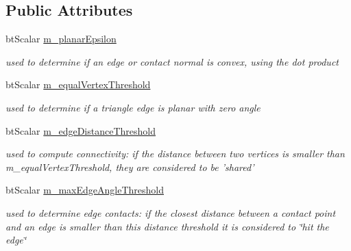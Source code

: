 \subsection*{Public Attributes}
\begin{CompactItemize}
\item 
\hypertarget{structbt_triangle_info_map_7516c96369cd0eef22286b7e5ad537e8}{
btScalar \hyperlink{structbt_triangle_info_map_7516c96369cd0eef22286b7e5ad537e8}{m\_\-planarEpsilon}}
\label{structbt_triangle_info_map_7516c96369cd0eef22286b7e5ad537e8}

\begin{CompactList}\small\item\em used to determine if an edge or contact normal is convex, using the dot product \item\end{CompactList}\item 
\hypertarget{structbt_triangle_info_map_a980d33e5be082442a128f0ba2efb064}{
btScalar \hyperlink{structbt_triangle_info_map_a980d33e5be082442a128f0ba2efb064}{m\_\-equalVertexThreshold}}
\label{structbt_triangle_info_map_a980d33e5be082442a128f0ba2efb064}

\begin{CompactList}\small\item\em used to determine if a triangle edge is planar with zero angle \item\end{CompactList}\item 
\hypertarget{structbt_triangle_info_map_521c0769aefc5c02b8394f924127dfc5}{
btScalar \hyperlink{structbt_triangle_info_map_521c0769aefc5c02b8394f924127dfc5}{m\_\-edgeDistanceThreshold}}
\label{structbt_triangle_info_map_521c0769aefc5c02b8394f924127dfc5}

\begin{CompactList}\small\item\em used to compute connectivity: if the distance between two vertices is smaller than m\_\-equalVertexThreshold, they are considered to be 'shared' \item\end{CompactList}\item 
\hypertarget{structbt_triangle_info_map_3fca61db63fe0db431044d0eba95107a}{
btScalar \hyperlink{structbt_triangle_info_map_3fca61db63fe0db431044d0eba95107a}{m\_\-maxEdgeAngleThreshold}}
\label{structbt_triangle_info_map_3fca61db63fe0db431044d0eba95107a}

\begin{CompactList}\small\item\em used to determine edge contacts: if the closest distance between a contact point and an edge is smaller than this distance threshold it is considered to \char`\"{}hit the edge\char`\"{} \item\end{CompactList}\end{CompactItemize}


